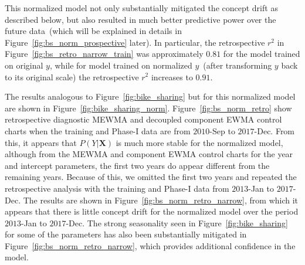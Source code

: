 \documentclass[twoside,11pt]{article}
\begin{document}
This normalized model not only substantially mitigated the concept drift as described below, but also resulted in much better predictive power over the future data~(which will be explained in details in Figure~\ref{fig:bs_norm_prospective} later). In particular, the retrospective $r^2$ in Figure~\ref{fig:bs_retro_narrow_train} was approximately $0.81$ for the model trained on original $y$, while for model trained on normalized $y$~(after transforming $y$ back to its original scale) the retrospective $r^2$ increases to $0.91$. %

The results analogous to Figure~\ref{fig:bike_sharing} but for this normalized model are shown in Figure~\ref{fig:bike_sharing_norm}. Figure~\ref{fig:bs_norm_retro} show retrospective diagnostic MEWMA and decoupled component EWMA control charts when the training and Phase-I data are from $2010$-Sep to $2017$-Dec. From this, it appears that $P(Y|\bm{X})$ is much more stable for the normalized model, although from the MEWMA and component EWMA control charts for the year and intercept parameters, the first two years do appear different from the remaining years. Because of this, we omitted the first two years and repeated the retrospective analysis with the training and Phase-I data from $2013$-Jan to $2017$-Dec. The results are shown in Figure~\ref{fig:bs_norm_retro_narrow}, from which it appears that there is little concept drift for the normalized model over the period $2013$-Jan to $2017$-Dec. The strong seasonality seen in Figure~\ref{fig:bike_sharing} for some of the parameters has also been substantially mitigated in Figure~\ref{fig:bs_norm_retro_narrow}, which provides additional confidence in the model.
\end{document}
